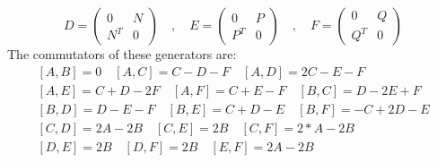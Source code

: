 \documentclass[12pt]{article}
\begin{document}
\begin{displaymath}
D = \left( \begin{array}{cc}
0 & N \\
N^T & 0
\end{array} \right) \quad , \quad
E = \left( \begin{array}{cc}
0 & P \\
P^T & 0
\end{array} \right) \quad , \quad
F = \left( \begin{array}{cc}
0 & Q \\
Q^T & 0
\end{array} \right)
\end{displaymath}
The commutators of these generators are:
\begin{eqnarray*}
\left[ A,B \right] = 0 \quad\left[ A,C \right] = C-D-F \quad\left[ A,D \right] = 2C-E-F\\
\left[ A,E \right] = C+D-2F \quad\left[ A,F \right] = C+E-F \quad\left[ B,C \right] = D-2E+F\\
\left[ B,D \right] = D-E-F \quad\left[ B,E \right] = C+D-E \quad\left[ B,F \right] = -C+2D-E\\
\left[ C,D \right] = 2A-2B \quad\left[ C,E \right] = 2B \quad\left[ C,F \right] = 2*A-2B\\
\left[ D,E \right] = 2B \quad\left[ D,F \right] = 2B \quad\left[ E,F \right] = 2A-2B 
\end{eqnarray*}
\end{document}
